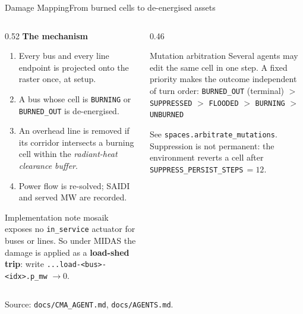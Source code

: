 \documentclass[aspectratio=169,9pt]{beamer}
\newcommand{\code}[1]{{\small\texttt{#1}}}
\newcommand{\gold}[1]{{\color{cslaeaglegold}\textbf{#1}}}
\newcommand{\srcnote}[1]{\vfill{\scriptsize\color{csladarkgray}#1}}
\begin{document}
\begin{frame}{Damage Mapping}{From burned cells to de-energised assets}
  \begin{columns}[T,onlytextwidth]
    \begin{column}{0.52\textwidth}
      \textbf{The mechanism}
      \begin{enumerate}
        \small
        \item Every bus and every line endpoint is projected onto the
              raster once, at setup.
        \item A bus whose cell is \code{BURNING} or \code{BURNED\_OUT}
              is de-energised.
        \item An overhead line is removed if its corridor intersects a
              burning cell within the \emph{radiant-heat clearance
              buffer}.
        \item Power flow is re-solved; SAIDI and served MW are recorded.
      \end{enumerate}
      \vskip4pt
      \begin{block}{Implementation note}
        \small mosaik exposes no \code{in\_service} actuator for buses or
        lines. So under MIDAS the damage is applied as a
        \gold{load-shed trip}: write
        \code{...load-<bus>-<idx>.p\_mw} $\rightarrow 0$.
      \end{block}
    \end{column}
    \begin{column}{0.46\textwidth}
      \begin{alertblock}{Mutation arbitration}
        \small Several agents may edit the same cell in one step. A fixed
        priority makes the outcome independent of turn order:
        \vskip3pt
        \centering
        \code{BURNED\_OUT} (terminal) $>$ \code{SUPPRESSED} $>$
        \code{FLOODED} $>$ \code{BURNING} $>$ \code{UNBURNED}
        \vskip3pt
        \raggedright
        See \code{spaces.arbitrate\_mutations}. Suppression is not
        permanent: the environment reverts a cell after
        \code{SUPPRESS\_PERSIST\_STEPS}\,$=12$.
      \end{alertblock}
    \end{column}
  \end{columns}
  \srcnote{Source: \texttt{docs/CMA\_AGENT.md}, \texttt{docs/AGENTS.md}.}
\end{frame}
\end{document}
